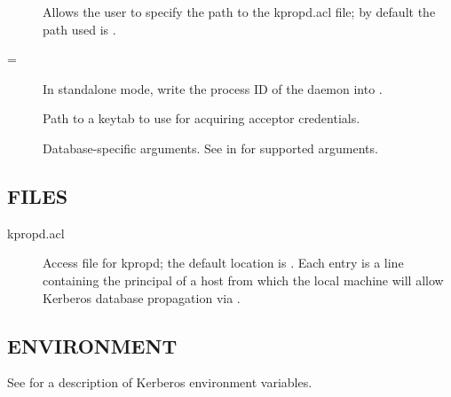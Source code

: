 \documentclass[letterpaper,10pt,english]{sphinxmanual}
\begin{document}
\begin{description}
\item[{ }] \leavevmode
Allows the user to specify the path to the kpropd.acl file; by
default the path used is {\hyperref[\detokenize{mitK5defaults:paths}]{}}.

\item[{=}] \leavevmode
In standalone mode, write the process ID of the daemon into
.

\item[{ }] \leavevmode
Path to a keytab to use for acquiring acceptor credentials.

\item[{ }] \leavevmode
Database-specific arguments.  See {\hyperref[\detokenize{admin/admin_commands/kadmin_local:dboptions}]{}} in {\hyperref[\detokenize{admin/admin_commands/kadmin_local:kadmin-1}]{}} for supported arguments.

\end{description}


\subsection{FILES}
\label{\detokenize{admin/admin_commands/kpropd:files}}\begin{description}
\item[{kpropd.acl}] \leavevmode
Access file for kpropd; the default location is
.  Each entry is a line
containing the principal of a host from which the local machine
will allow Kerberos database propagation via {\hyperref[\detokenize{admin/admin_commands/kprop:kprop-8}]{}}.

\end{description}


\subsection{ENVIRONMENT}
\label{\detokenize{admin/admin_commands/kpropd:environment}}
See  for a description of Kerberos environment
variables.
\end{document}
